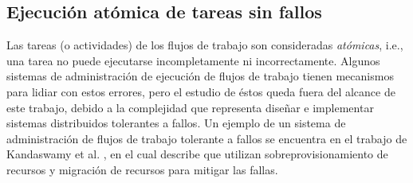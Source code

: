 \subsection{Ejecución atómica de tareas sin fallos}
Las tareas (o actividades) de los flujos de trabajo son consideradas \emph{atómicas}, i.e., una tarea no puede ejecutarse incompletamente ni incorrectamente. Algunos sistemas de administración de ejecución de flujos de trabajo tienen mecanismos para lidiar con estos errores, pero el estudio de éstos queda fuera del alcance de este trabajo, debido a la complejidad que representa diseñar e implementar sistemas distribuidos tolerantes a fallos. Un ejemplo de un sistema de administración de flujos de trabajo tolerante a fallos se encuentra en el trabajo de Kandaswamy et al. \cite{kandaswamy2008fault}, en el cual describe que utilizan sobreprovisionamiento de recursos y migración de recursos para mitigar las fallas.










